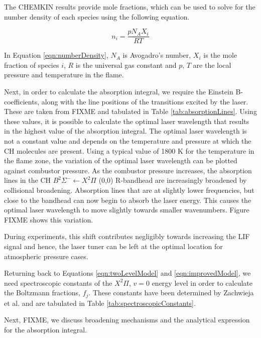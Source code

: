 The CHEMKIN results provide mole fractions, which can be used to solve for the number density of each species using the following equation.

\begin{equation}
  n_i = \frac{pN_AX_i}{RT}
  \label{eqn:numberDensity}
\end{equation}

In Equation \ref{eqn:numberDensity}, \(N_A\) is Avogadro's number, \(X_i\) is the mole fraction of species \(i\), \(R\) is the universal gas constant and \(p\), \(T\) are the local pressure and temperature in the flame.

Next, in order to calculate the absorption integral, we require the Einstein B-coefficients, along with the line positions of the transitions excited by the laser.
These are taken from FIXME and tabulated in Table \ref{tab:absorptionLines}.
Using these values, it is possible to calculate the optimal laser wavelength that results in the highest value of the absorption integral.
The optimal laser wavelength is not a constant value and depends on the temperature and pressure at which the CH molecules are present.
Using a typical value of 1800 K for the temperature in the flame zone, the variation of the optimal laser wavelength can be plotted against combustor pressure.
As the combustor pressure increases, the absorption lines in the CH \(B^2\Sigma^-\leftarrow X^2\Pi\) (0,0) R-bandhead are increasingly broadened by collisional broadening.
Absorption lines that are at slightly lower frequencies, but close to the bandhead can now begin to absorb the laser energy.
This causes the optimal laser wavelength to move slightly towards smaller wavenumbers.
Figure FIXME shows this variation.

During experiments, this shift contributes negligibly towards increasing the LIF signal and hence, the laser tuner can be left at the optimal location for atmospheric pressure cases.



Returning back to Equations \ref{eqn:twoLevelModel} and \ref{eqn:improvedModel}, we need spectroscopic constants of the \(X^2\Pi\), \(v=0\) energy level in order to calculate the Boltzmann fractions, \(f_j\).
These constants have been determined by Zachwieja et al.\cite{1995-zachwieja} and are tabulated in Table \ref{tab:spectroscopicConstants}.

Next, FIXME, we discuss broadening mechanisms and the analytical expression for the absorption integral.

